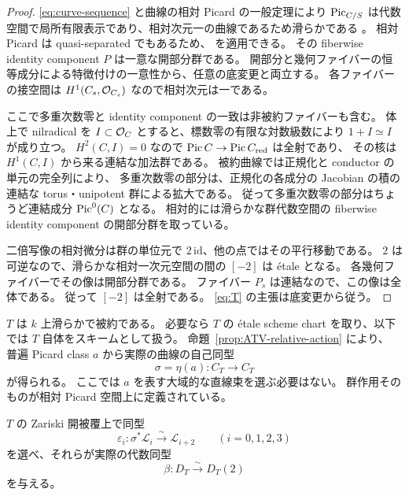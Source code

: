 \begin{proof}
\eqref{eq:curve-sequence} と曲線の相対 Picard の一般定理により
$\operatorname{Pic}_{C/S}$ は代数空間で局所有限表示であり、相対次元一の曲線であるため滑らかである
\cite[Lemma 108.9.5]{StacksRelativePicard}。
相対 Picard は quasi-separated でもあるため、
\cite[Appendix A, Lemma A.1]{HolmesMolchoOrecchiaPoiret2023} を適用できる。
その fiberwise identity component $P$ は一意な開部分群である。
開部分と幾何ファイバーの恒等成分による特徴付けの一意性から、任意の底変更と両立する。
各ファイバーの接空間は $H^1(C_s,\mathcal O_{C_s})$ なので相対次元は一である。

ここで多重次数零と identity component の一致は非被約ファイバーも含む。
体上で nilradical を $I\subset\mathcal O_C$ とすると、標数零の有限な対数級数により
$1+I\simeq I$ が成り立つ。
$H^2(C,I)=0$ なので $\operatorname{Pic} C\to\operatorname{Pic} C_{\mathrm{red}}$ は全射であり、
その核は $H^1(C,I)$ から来る連結な加法群である。
被約曲線では正規化と conductor の単元の完全列により、
多重次数零の部分は、正規化の各成分の Jacobian の積の
連結な torus・unipotent 群による拡大である。
従って多重次数零の部分はちょうど連結成分 $\operatorname{Pic}^0(C)$ となる。
相対的には滑らかな群代数空間の fiberwise identity component の開部分群を取っている。

二倍写像の相対微分は群の単位元で $2\,\mathrm{id}$、他の点ではその平行移動である。
$2$ は可逆なので、滑らかな相対一次元空間の間の $[-2]$ は étale となる。
各幾何ファイバーでその像は開部分群である。
ファイバー $P_s$ は連結なので、この像は全体である。
従って $[-2]$ は全射である。
\eqref{eq:T} の主張は底変更から従う。
\end{proof}

$T$ は $k$ 上滑らかで被約である。
必要なら $T$ の étale scheme chart を取り、以下では $T$ 自体をスキームとして扱う。
命題~\ref{prop:ATV-relative-action} により、
普遍 Picard class $a$ から実際の曲線の自己同型
\[
 \sigma=\eta(a):C_T\longrightarrow C_T
 \tag{PR-6}\label{eq:sigma}
\]
が得られる。
ここでは $a$ を表す大域的な直線束を選ぶ必要はない。
群作用そのものが相対 Picard 空間上に定義されている。

\begin{lemma}[線束の比較と二周期]\label{lem:relative-beta}
$T$ の Zariski 開被覆上で同型
\[
 \varepsilon_i:\sigma^*\mathcal L_i\xrightarrow{\sim}\mathcal L_{i+2}
 \qquad(i=0,1,2,3)
 \tag{PR-7}\label{eq:epsilons}
\]
を選べ、それらが実際の代数同型
\[
 \beta:D_T\xrightarrow{\sim}D_T(2)
 \tag{PR-8}\label{eq:beta}
\]
を与える。
\end{lemma}

